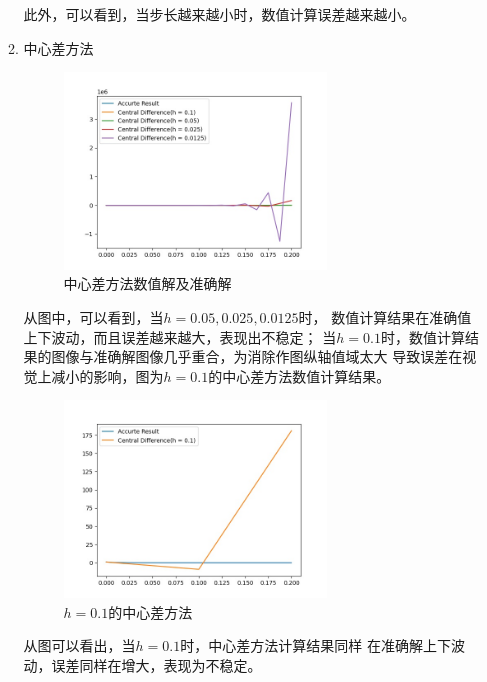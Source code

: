 \documentclass{article}
\begin{document}
\begin{enumerate}
\begin{enumerate}
        此外，可以看到，当步长越来越小时，数值计算误差越来越小。
        \item 中心差方法
        \begin{figure}[H]
            \centering
            \includegraphics[width=0.7\textwidth]{../fig/central_difference.jpg}
            \caption{中心差方法数值解及准确解}
            \label{central_difference}
        \end{figure}
        从图中，可以看到，当$h = 0.05, 0.025, 0.0125$时，
        数值计算结果在准确值上下波动，而且误差越来越大，表现出不稳定；
        当$h = 0.1$时，数值计算结果的图像与准确解图像几乎重合，为消除作图纵轴值域太大
        导致误差在视觉上减小的影响，图为$h = 0.1$的中心差方法数值计算结果。
        \begin{figure}[H]
            \centering
            \includegraphics[width=0.7\textwidth]{../fig/central_difference_h_0.1.jpg}
            \caption{$h = 0.1$的中心差方法}
            \label{central_difference_0.1}
        \end{figure}
        从图可以看出，当$h = 0.1$时，中心差方法计算结果同样
        在准确解上下波动，误差同样在增大，表现为不稳定。


\end{enumerate}
\end{enumerate}
\end{document}
